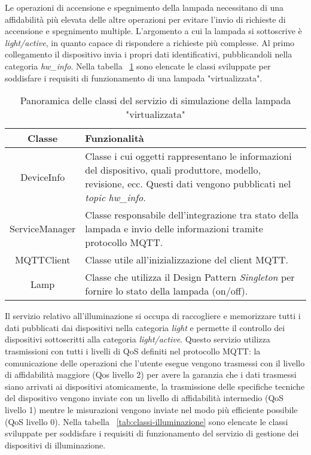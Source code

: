 Le operazioni di accensione e spegnimento della lampada necessitano di una affidabilità più elevata delle altre operazioni per evitare l'invio di richieste di accensione e spegnimento multiple.
L'argomento a cui la lampada si sottoscrive è \emph{light/active}, in quanto capace di rispondere a richieste più complesse. Al primo collegamento il dispositivo invia i propri dati identificativi, pubblicandoli nella categoria \emph{hw\_info}.
Nella tabella ~\ref{tab:classi-lampada} sono elencate le classi sviluppate per soddisfare i requisiti di funzionamento di una lampada "virtualizzata".


\begin{table}[!h]
\caption{Panoramica delle classi del servizio di simulazione della lampada "virtualizzata"}
\label{tab:classi-lampada}
\begin{tabularx}{\linewidth}{|c|X|}
\hline
\textbf{Classe} & \textbf{Funzionalità} \\
\hline
DeviceInfo & Classe i cui oggetti rappresentano le informazioni del dispositivo, quali produttore, modello, revisione, ecc. Questi dati vengono pubblicati nel \emph{topic} \emph{hw\_info}. \\
\hline
ServiceManager & Classe responsabile dell'integrazione tra stato della lampada e invio delle informazioni tramite protocollo MQTT. \\
\hline
MQTTClient & Classe utile all'inizializzazione del client MQTT. \\
\hline
Lamp & Classe che utilizza il Design Pattern \emph{Singleton} per fornire lo stato della lampada (on/off). \\
\hline
\end{tabularx}
\end{table}


Il servizio relativo all'illuminazione si occupa di raccogliere e memorizzare tutti i dati pubblicati dai dispositivi nella categoria \emph{light} e permette il controllo dei dispositivi sottoscritti alla categoria \emph{light/active}.
Questo servizio utilizza trasmissioni con tutti i livelli di QoS definiti nel protocollo MQTT: la comunicazione delle operazioni che l'utente esegue vengono trasmessi con il livello di affidabilità maggiore (Qos livello 2) per avere la garanzia che i dati trasmessi siano arrivati ai dispositivi atomicamente, la trasmissione delle specifiche tecniche del dispositivo vengono inviate con un livello di affidabilità intermedio (QoS livello 1) mentre le misurazioni vengono inviate nel modo più efficiente possibile (QoS livello 0).
Nella tabella ~\ref{tab:classi-illuminazione} sono elencate le classi sviluppate per soddisfare i requisiti di funzionamento del servizio di gestione dei dispositivi di illuminazione.

